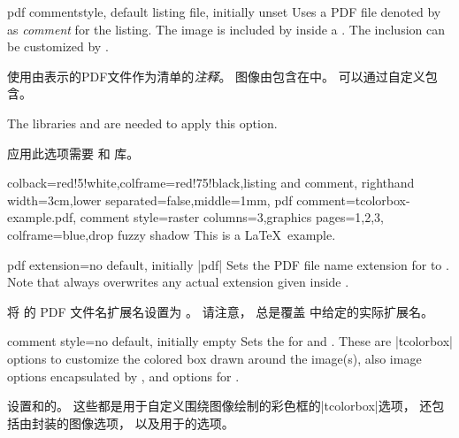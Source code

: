 
\begin{docTcbKey}[][doc new=2014-11-14]{pdf comment}{}{style, default listing file, initially unset}
Uses a PDF file denoted by  as \textit{comment} for the listing.
The image is included by  inside a .
The inclusion can be customized by .

使用由表示的PDF文件作为清单的\textit{注释}。 图像由包含在中。 可以通过自定义包含。
\begin{marker}
The libraries  and  are needed to apply this option.

应用此选项需要  和  库。
\end{marker}
\medskip
\begin{dispExample}
\begin{tcblisting}{colback=red!5!white,colframe=red!75!black,listing and comment,
righthand width=3cm,lower separated=false,middle=1mm,
pdf comment={tcolorbox-example.pdf},
comment style={raster columns=3,graphics pages={1,2,3},
colframe=blue,drop fuzzy shadow}}
This is a \LaTeX\ example.
\end{tcblisting}
\end{dispExample}
\end{docTcbKey}



\begin{docTcbKey}[][doc new=2014-11-14]{pdf extension}{=}{no default, initially |pdf|}
Sets the PDF file name extension for  to .
Note that  always overwrites any actual extension given
inside .

将  的 PDF 文件名扩展名设置为 。 请注意， 总是覆盖  中给定的实际扩展名。
\end{docTcbKey}


\begin{docTcbKey}[][doc new=2014-11-14]{comment style}{=}{no default, initially empty}
Sets the  for  and .
These are |tcolorbox| options to customize the colored box drawn around the
image(s), also image options encapsulated by ,
and  options for .

设置和的。 这些都是用于自定义围绕图像绘制的彩色框的|tcolorbox|选项， 还包括由封装的图像选项， 以及用于的选项。
\end{docTcbKey}


